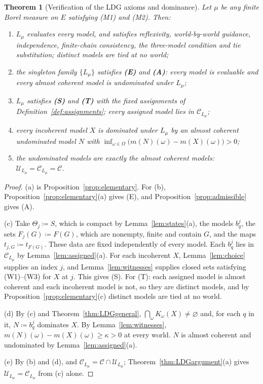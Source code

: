 \documentclass[11pt]{article}
\newtheorem{theorem}{Theorem}[section]
\theoremstyle{definition}
\newcommand{\C}{\mathcal C}
\newcommand{\U}{\mathcal U}
\newcommand{\Lmu}{L_\mu}
\begin{document}
\begin{theorem}[Verification of the LDG axioms and dominance]\label{thm:main}
Let $\mu$ be any finite Borel measure on $E$ satisfying (M1) and (M2). Then:
\begin{enumerate}[label=(\alph*)]
\item $\Lmu$ evaluates every model, and satisfies reflexivity, world-by-world guidance, independence, finite-chain consistency, the three-model condition and tie substitution; distinct models are tied at no world;
\item the singleton family $\{\Lmu\}$ satisfies \textbf{(E)} and \textbf{(A)}: every model is evaluable and every almost coherent model is undominated under $\Lmu$;
\item $\Lmu$ satisfies \textbf{{\color{red}(S)}} and \textbf{{\color{red}(T)}} with the fixed assignments of Definition~\ref{def:assignments}; every assigned model lies in $\C_{\Lmu}$;
\item every incoherent model $X$ is dominated under $\Lmu$ by an almost coherent undominated model $N$ with $\inf_{\omega\in\Omega}\bigl(m(N)(\omega)-m(X)(\omega)\bigr)>0$;
\item the undominated models are exactly the almost coherent models: $\U_{\Lmu}=\C_{\Lmu}=\C$.
\end{enumerate}
\end{theorem}
\begin{proof}
(a) is Proposition~\ref{prop:elementary}. For (b), Proposition~\ref{prop:elementary}(a) gives (E), and Proposition~\ref{prop:admissible} gives (A).

(c) Take $\Theta_j\coloneqq S$, which is compact by Lemma~\ref{lem:states}(a), the models $b^j_q$, the sets $F_j(G)\coloneqq F(G)$, which are nonempty, finite and contain $G$, and the maps $t_{j,G}\coloneqq t_{F(G)}$. These data are fixed independently of every model. Each $b^j_q$ lies in $\C_{\Lmu}$ by Lemma~\ref{lem:assigned}(a). {\color{red}For each incoherent $X$, Lemma~\ref{lem:choice} supplies an index $j$, and Lemma~\ref{lem:witnesses} supplies closed sets satisfying (W1)--(W3) for $X$ at $j$. This gives (S). For (T): each assigned model is almost coherent and each incoherent model is not, so they are distinct models, and by Proposition~\ref{prop:elementary}(c) distinct models are tied at no world.}

(d) By (c) and Theorem~\ref{thm:LDGgeneral}, $\bigcap_\omega K_\omega(X)\ne\varnothing$ and, for each $q$ in it, $N\coloneqq b^j_q$ dominates $X$. By Lemma~\ref{lem:witnesses}, $m(N)(\omega)-m(X)(\omega)\ge\kappa>0$ at every world. $N$ is almost coherent and undominated by Lemma~\ref{lem:assigned}(a).

(e) By (b) and (d), and $\C_{\Lmu}=\C\cap\U_{\Lmu}$; Theorem~\ref{thm:LDGargument}(a) gives $\U_{\Lmu}=\C_{\Lmu}$ from (c) alone.
\end{proof}
\end{document}
